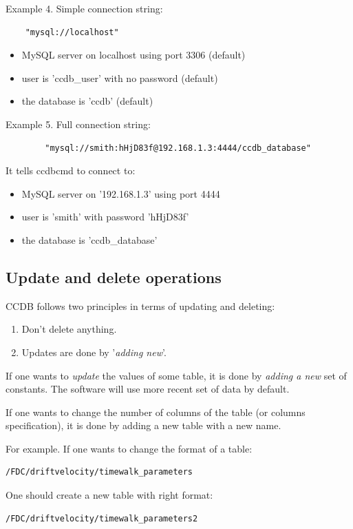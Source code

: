 \documentclass{article}
\begin{document}
Example 4. Simple connection string:
\begin{verbatim}	
	"mysql://localhost"
\end{verbatim}

\begin{itemize}
  \item MySQL server on localhost using port 3306 (default)
  \item user is 'ccdb\_user' with no password (default)
  \item the database is 'ccdb' (default)
\end{itemize}


Example 5. Full connection string:
\begin{verbatim}	
        "mysql://smith:hHjD83f@192.168.1.3:4444/ccdb_database"
\end{verbatim}

It tells ccdbcmd to connect to:
\begin{itemize}
  \item MySQL server  on '192.168.1.3' using port 4444
  \item user is 'smith' with password 'hHjD83f'
  \item the database is 'ccdb\_database'
\end{itemize}


\subsection{Update and delete operations}

CCDB follows two principles in terms of updating and deleting:
\begin{enumerate}
\item Don't delete anything.
\item Updates are done by '\textit{adding new}'.
\end{enumerate}

If one wants to \textit{update} the values of some table, it is done by
\textit{adding a new} set of constants. The software will use more recent set
of data by default.

If one wants to change the number of columns of the table (or columns
specification), it is done by adding a new table with a new name.

For example. If one wants to change the format of a table:
\begin{verbatim}
/FDC/driftvelocity/timewalk_parameters
\end{verbatim}
One should create a new table with right format:
\begin{verbatim}
/FDC/driftvelocity/timewalk_parameters2
\end{verbatim}
\end{document}
